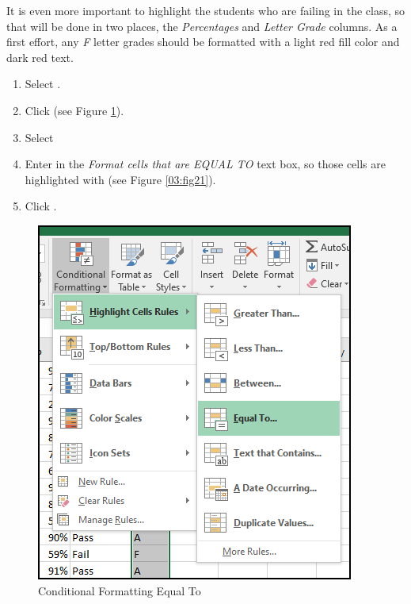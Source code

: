 It is even more important to highlight the students who are failing in the class, so that will be done in two places, the \textit{Percentages} and \textit{Letter Grade} columns. As a first effort, any \textit{F} letter grades should be formatted with a light red fill color and dark red text.

\begin{enumbox}
	\begin{enumerate}
		\item Select .
		\item Click  (see Figure \ref{03:fig20}).
		\item Select 
		\item Enter  in the \textit{Format cells that are EQUAL TO} text box, so those cells are highlighted with  (see Figure \ref{03:fig21}).
		\item Click .
	\end{enumerate}
\end{enumbox}
	
\begin{figure}[H]
	\centering
	\includegraphics[width=\maxwidth{.95\linewidth}]{gfx/ch03_fig20}
	\caption{Conditional Formatting Equal To}
	\label{03:fig20}
\end{figure}

